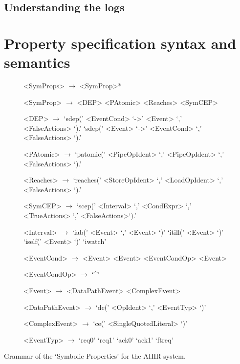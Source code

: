 \documentclass[12pt,a4paper]{article}
\begin{document}
\subsection{Understanding the logs}

\clearpage
\section{Property specification syntax and semantics}\label{Sec:Props}

\begin{figure}
\begin{grammar}
<SymProps>      $\rightarrow$ <SymProp>*

<SymProp>       $\rightarrow$ <DEP>
                \alt          <PAtomic>
                \alt          <Reaches>
                \alt          <SymCEP>

<DEP>           $\rightarrow$ `sdep(' <EventCond> `->' <Event> `,' <FalseActions> `).'
                \alt          `sdep(' <Event> `->' <EventCond> `,' <FalseActions> `).'

<PAtomic>       $\rightarrow$ `patomic(' <PipeOpIdent> `,' <PipeOpIdent> `,' <FalseActions> `).'

<Reaches>       $\rightarrow$ `reaches(' <StoreOpIdent> `,' <LoadOpIdent> `,' <FalseActions> `).'

<SymCEP>        $\rightarrow$ `scep(' <Interval> `,' <CondExpr> `,' <TrueActions> `,' <FalseActions>`).'

<Interval>      $\rightarrow$ `iab(' <Event> `,' <Event> `)'
                \alt          `itill(' <Event> `)'
                \alt          `iself(' <Event> `)'
                \alt          `iwatch'

<EventCond>     $\rightarrow$ <Event>
                \alt          <Event> <EventCondOp> <Event>

<EventCondOp>   $\rightarrow$ `^'

<Event>         $\rightarrow$ <DataPathEvent>
                \alt          <ComplexEvent>

<DataPathEvent> $\rightarrow$ `de(' <OpIdent> `,' <EventTyp> `)'

<ComplexEvent>  $\rightarrow$ `ce(' <SingleQuotedLiteral> `)'

<EventTyp>      $\rightarrow$ `req0'
                \alt          `req1'
                \alt          `ack0'
                \alt          `ack1'
                \alt          `ftreq'

\end{grammar}
\end{figure}
Grammar of the `Symbolic Properties' for the AHIR system.
\end{document}
